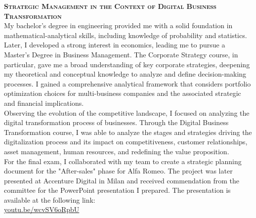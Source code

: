 
\textbf{\textsc{Strategic Management in the Context of Digital Business Transformation}} \\
My bachelor's degree in engineering provided me with a solid foundation in mathematical-analytical skills, including knowledge of probability and statistics. Later, I developed a strong interest in economics, leading me to pursue a Master’s Degree in Business Management. The Corporate Strategy course, in particular, gave me a broad understanding of key corporate strategies, deepening my theoretical and conceptual knowledge to analyze and define decision-making processes. I gained a comprehensive analytical framework that considers portfolio optimization choices for multi-business companies and the associated strategic and financial implications. \\
Observing the evolution of the competitive landscape, I focused on analyzing the digital transformation process of businesses. Through the Digital Business Transformation course, I was able to analyze the stages and strategies driving the digitalization process and its impact on competitiveness, customer relationships, asset management, human resources, and redefining the value proposition. \\
For the final exam, I collaborated with my team to create a strategic planning document for the "After-sales" phase for Alfa Romeo. The project was later presented at Accenture Digital in Milan and received commendation from the committee for the PowerPoint presentation I prepared. The presentation is available at the following link: \\
\href{https://youtu.be/wcvSV6oRpbU}{youtu.be/wcvSV6oRpbU}

